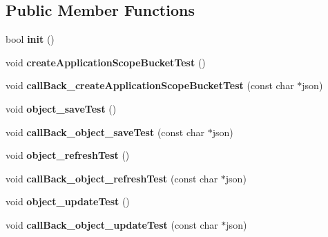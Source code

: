 \subsection*{Public Member Functions}
\begin{DoxyCompactItemize}
\item 
\hypertarget{class_c_kii_api_test_ac9326184d44029a868e18ce77ad75890}{bool {\bfseries init} ()}\label{class_c_kii_api_test_ac9326184d44029a868e18ce77ad75890}

\item 
\hypertarget{class_c_kii_api_test_adb2b39d80766474f3259987cdaad2891}{void {\bfseries create\-Application\-Scope\-Bucket\-Test} ()}\label{class_c_kii_api_test_adb2b39d80766474f3259987cdaad2891}

\item 
\hypertarget{class_c_kii_api_test_afc4622e3fe7f3054cc6e4d0cda05a35d}{void {\bfseries call\-Back\-\_\-create\-Application\-Scope\-Bucket\-Test} (const char $\ast$json)}\label{class_c_kii_api_test_afc4622e3fe7f3054cc6e4d0cda05a35d}

\item 
\hypertarget{class_c_kii_api_test_a65020b963779cefb226f66524fd6481f}{void {\bfseries object\-\_\-save\-Test} ()}\label{class_c_kii_api_test_a65020b963779cefb226f66524fd6481f}

\item 
\hypertarget{class_c_kii_api_test_aef8e5dc6b2c1ebc5523601a2bf672cfb}{void {\bfseries call\-Back\-\_\-object\-\_\-save\-Test} (const char $\ast$json)}\label{class_c_kii_api_test_aef8e5dc6b2c1ebc5523601a2bf672cfb}

\item 
\hypertarget{class_c_kii_api_test_a4ac2523bca52b9fe513e7aa27db844e0}{void {\bfseries object\-\_\-refresh\-Test} ()}\label{class_c_kii_api_test_a4ac2523bca52b9fe513e7aa27db844e0}

\item 
\hypertarget{class_c_kii_api_test_aa1b1c7d7687412af8d9167d26ed52459}{void {\bfseries call\-Back\-\_\-object\-\_\-refresh\-Test} (const char $\ast$json)}\label{class_c_kii_api_test_aa1b1c7d7687412af8d9167d26ed52459}

\item 
\hypertarget{class_c_kii_api_test_afa974f9e71dfcb5096b9ac7ac58d3576}{void {\bfseries object\-\_\-update\-Test} ()}\label{class_c_kii_api_test_afa974f9e71dfcb5096b9ac7ac58d3576}

\item 
\hypertarget{class_c_kii_api_test_a1bff468f0ca034e75ccb4d6247baed20}{void {\bfseries call\-Back\-\_\-object\-\_\-update\-Test} (const char $\ast$json)}\label{class_c_kii_api_test_a1bff468f0ca034e75ccb4d6247baed20}

\end{DoxyCompactItemize}

